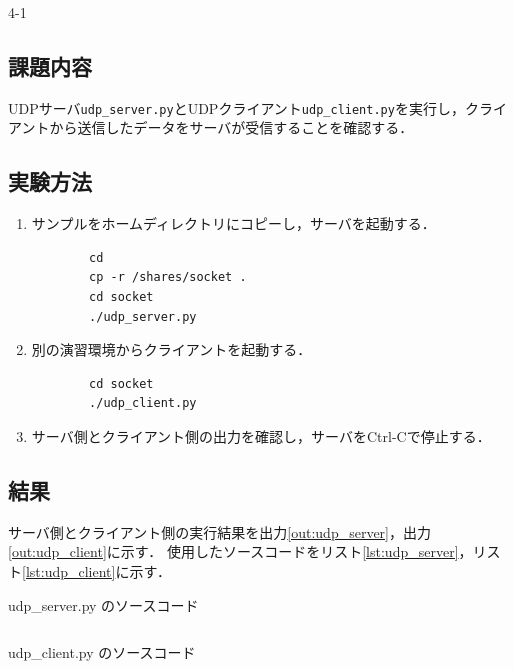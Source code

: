 \begin{maintask}{4-1}
  \subsection*{課題内容}
  UDPサーバ\texttt{udp\_server.py}とUDPクライアント\texttt{udp\_client.py}を実行し，クライアントから送信したデータをサーバが受信することを確認する．

  \subsection*{実験方法}
  \begin{enumerate}
    \item サンプルをホームディレクトリにコピーし，サーバを起動する．
      \begin{verbatim}
        cd
        cp -r /shares/socket .
        cd socket
        ./udp_server.py
      \end{verbatim}
    \item 別の演習環境からクライアントを起動する．
      \begin{verbatim}
        cd socket
        ./udp_client.py
      \end{verbatim}
    \item サーバ側とクライアント側の出力を確認し，サーバをCtrl-Cで停止する．
  \end{enumerate}

  \subsection*{結果}
  サーバ側とクライアント側の実行結果を出力\ref{out:udp_server}，出力\ref{out:udp_client}に示す．
  使用したソースコードをリスト\ref{lst:udp_server}，リスト\ref{lst:udp_client}に示す．
  \begin{listing}[H]
    \caption{udp\_server.py のソースコード}\label{lst:udp_server}
    \inputminted[fontsize=\small]{python}{src/day4/udp_server.py}
  \end{listing}
  \begin{listing}[H]
    \caption{udp\_client.py のソースコード}\label{lst:udp_client}
    \inputminted[fontsize=\small]{python}{src/day4/udp_client.py}
  \end{listing}
 

\end{maintask}
